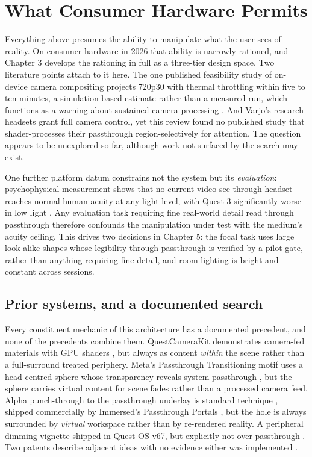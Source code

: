 \section{What Consumer Hardware Permits}

Everything above presumes the ability to manipulate what the user sees of reality. On consumer
hardware in 2026 that ability is narrowly rationed, and Chapter 3 develops the rationing in full as a
three-tier design space. Two literature points attach to it here. The one published feasibility study
of on-device camera compositing projects 720p30 with thermal throttling within five to ten minutes, a
simulation-based estimate rather than a measured run, which functions as a warning about sustained
camera processing \citep{laghari2025}. And Varjo's research headsets grant full camera control, yet
this review found no published study that shader-processes their passthrough region-selectively for
attention. The question appears to be unexplored so far, although work not surfaced by the search
may exist.

One further platform datum constrains not the system but its \textit{evaluation}: psychophysical
measurement shows that no current video see-through headset reaches normal human acuity at any light
level, with Quest 3 significantly worse in low light \citep{wang2026}. Any evaluation task requiring
fine real-world detail read through passthrough therefore confounds the manipulation under test with
the medium's acuity ceiling. This drives two decisions in Chapter 5: the focal task uses large
look-alike shapes whose legibility through passthrough is verified by a pilot gate, rather than
anything requiring fine detail, and room lighting is bright and constant across sessions.

\subsection{Prior systems, and a documented search}
\label{sec:priorart}

Every constituent mechanic of this architecture has a documented precedent, and none of the
precedents combine them. QuestCameraKit demonstrates camera-fed materials with GPU shaders
\citep{coviello2025}, but always as content \textit{within} the scene rather than a full-surround
treated periphery. Meta's Passthrough Transitioning motif uses a head-centred sphere whose
transparency reveals system passthrough \citep{meta2024c}, but the sphere carries virtual content for
scene fades rather than a processed camera feed. Alpha punch-through to the passthrough underlay is
standard technique \citep{meta2024b}, shipped commercially by Immersed's Passthrough Portals
\citep{immersed2022}, but the hole is always surrounded by \textit{virtual} workspace rather than by
re-rendered reality. A peripheral dimming vignette shipped in Quest OS v67, but explicitly not over
passthrough \citep{meta2024d}. Two patents describe adjacent ideas with no evidence either was
implemented \citep{patents}.

